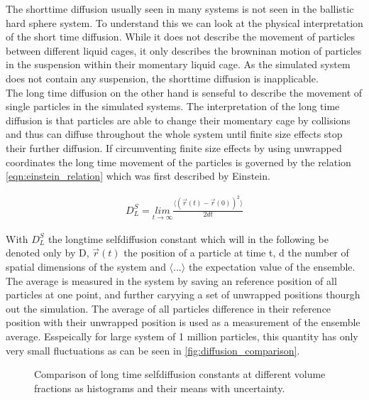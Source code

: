 The shorttime diffusion usually seen in many systems is not seen in the ballistic hard sphere system. To understand this we can look at the physical interpretation of the short time diffusion. While it does not describe the movement of particles between different liquid cages, it only describes the browninan motion of particles in the suspension within their momentary liquid cage. As the simulated system does not contain any suspension, the shorttime diffusion is inapplicable.\\

The long time diffusion on the other hand is senseful to describe the movement of single particles in the simulated systems. The interpretation of the long time diffusion is that particles are able to change their momentary cage by collisions and thus can diffuse throughout the whole system until finite size effects stop their further diffusion. If circumventing finite size effects by using unwrapped coordinates the long time movement of the particles is governed by the relation \autoref{eqn:einstein_relation} which was first described by Einstein.

\begin{align}
\label{eqn:einstein_relation}
D^S_L = \underset{t\rightarrow \infty}{lim} \frac{\langle (\vec{r}(t) - \vec{r}(0) )^2 \rangle}{2 d t}
\end{align}

With $D^S_L$ the longtime selfdiffusion constant which will in the following be denoted only by D, $\vec{r}(t)$ the position of a particle at time t, d the number of spatial dimensions of the system and $\langle ... \rangle$ the expectation value of the ensemble.\\

The average is measured in the system by saving an reference position of all particles at one point, and further caryying a set of unwrapped positions thourgh out the simulation. The average of all particles difference in their reference position with their unwrapped position is used as a measurement of the ensemble average. Esspeically for large system of 1 million particles, this quantity has only very small fluctuations as can be seen in \autoref{fig:diffusion_comparison}.


\begin{figure}[h]
\begin{center}
 \hspace{0.5cm}
\caption{Comparison of long time selfdiffusion constants at different volume fractions as histograms and their means with uncertainty.}
\label{fig:diffusion_comparison}
\end{center}
\end{figure}

